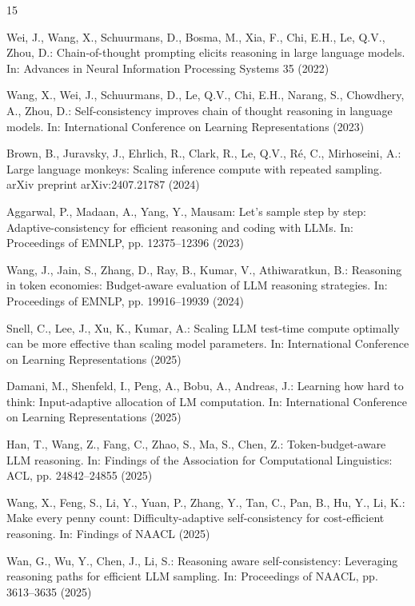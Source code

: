 \documentclass[runningheads]{llncs}
\begin{document}
\begin{thebibliography}{15}

Wei, J., Wang, X., Schuurmans, D., Bosma, M., Xia, F., Chi, E.H., Le, Q.V.,
Zhou, D.: Chain-of-thought prompting elicits reasoning in large language
models. In: Advances in Neural Information Processing Systems 35 (2022)

Wang, X., Wei, J., Schuurmans, D., Le, Q.V., Chi, E.H., Narang, S.,
Chowdhery, A., Zhou, D.: Self-consistency improves chain of thought reasoning
in language models. In: International Conference on Learning Representations
(2023)

Brown, B., Juravsky, J., Ehrlich, R., Clark, R., Le, Q.V., R\'{e}, C.,
Mirhoseini, A.: Large language monkeys: Scaling inference compute with repeated
sampling. arXiv preprint arXiv:2407.21787 (2024)

Aggarwal, P., Madaan, A., Yang, Y., Mausam: Let's sample step by step:
Adaptive-consistency for efficient reasoning and coding with LLMs. In:
Proceedings of EMNLP, pp. 12375--12396 (2023)

Wang, J., Jain, S., Zhang, D., Ray, B., Kumar, V., Athiwaratkun, B.:
Reasoning in token economies: Budget-aware evaluation of LLM reasoning
strategies. In: Proceedings of EMNLP, pp. 19916--19939 (2024)

Snell, C., Lee, J., Xu, K., Kumar, A.: Scaling LLM test-time compute optimally
can be more effective than scaling model parameters. In: International
Conference on Learning Representations (2025)

Damani, M., Shenfeld, I., Peng, A., Bobu, A., Andreas, J.: Learning how hard to
think: Input-adaptive allocation of LM computation. In: International
Conference on Learning Representations (2025)

Han, T., Wang, Z., Fang, C., Zhao, S., Ma, S., Chen, Z.: Token-budget-aware
LLM reasoning. In: Findings of the Association for Computational Linguistics:
ACL, pp. 24842--24855 (2025)

Wang, X., Feng, S., Li, Y., Yuan, P., Zhang, Y., Tan, C., Pan, B., Hu, Y.,
Li, K.: Make every penny count: Difficulty-adaptive self-consistency for
cost-efficient reasoning. In: Findings of NAACL (2025)

Wan, G., Wu, Y., Chen, J., Li, S.: Reasoning aware self-consistency:
Leveraging reasoning paths for efficient LLM sampling. In: Proceedings of
NAACL, pp. 3613--3635 (2025)


\end{thebibliography}
\end{document}
